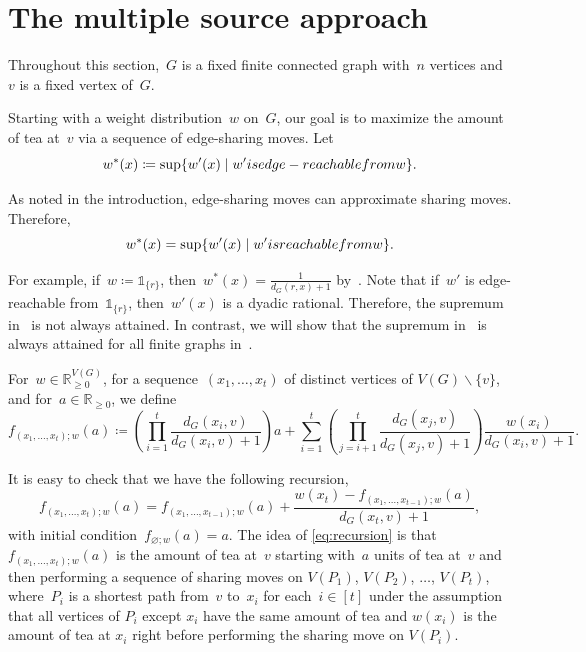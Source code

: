 \documentclass[reqno, 12pt]{amsart}
\numberwithin{equation}{section}
\numberwithin{figure}{section}
\theoremstyle{plain}
\theoremstyle{definition}
\let\emptyset=\varnothing
\let\setminus=\smallsetminus
\newcommand*{\weights}{\ensuremath{\mathbb{R}_{\geq 0}^{V(G)}}}
\begin{document}
\section{The multiple source approach}
\label{sec:second}


Throughout this section,~$G$ is a fixed finite connected graph with~$n$ vertices and~$v$ is a fixed vertex of~$G$. 

Starting with a weight distribution~$w$ on~$G$, our goal is to maximize the amount of tea at~$v$ via a sequence of edge-sharing moves. 
Let
\begin{equation} \label{eq:wstarreach}
    w^*(x) \coloneqq \sup \{ w'(x) \mid w' \textnormal{ is edge-reachable from } w \}. 
\end{equation}

As noted in the introduction, edge-sharing moves can approximate sharing moves.  Therefore,
\begin{equation} \label{eq:wstar}
    w^*(x) = \sup \{ w'(x) \mid w' \textnormal{ is reachable from } w \}. 
\end{equation}

For example, if~${w \coloneqq \mathds{1}_{\{r\}}}$, then~${w^*(x) = \frac{1}{d_G(r,x)+1}}$ by~. 
Note that if~$w'$ is edge-reachable from~$\mathds{1}_{\{r\}}$, then~${w'(x)}$ is a dyadic rational. 
Therefore, the supremum in~ is not always attained. 
In contrast, we will show that the supremum in~ is always attained for all finite graphs in~. 

For~${w \in \weights}$, for a sequence~$(x_1, \dots, x_t)$ of distinct vertices of ${V(G) \setminus \{v\}}$, and for~${a \in \mathbb{R}_{\geq 0}}$, we define
\[
        f_{(x_1, \ldots,x_t);w}(a) 
        \coloneqq \left(\prod_{i=1}^t\frac{d_G(x_i,v)}{d_G(x_i,v)+1} \right)a 
        + \sum_{i=1}^t \left(\prod_{j=i+1}^t \frac{d_G(x_j,v)}{d_G(x_j,v)+1} \right)\frac{w(x_i)}{d_G(x_i,v)+1}.
\]

It is easy to check that we have the following recursion, 
\begin{equation} \label{eq:recursion}
    f_{(x_1, \dots, x_t); w}(a) = f_{(x_1, \dots, x_{t-1}); w}(a) + \frac{w(x_t)-f_{(x_1, \dots, x_{t-1}); w}(a)}{d_G(x_t, v)+1},
\end{equation}
with initial condition~${f_{\emptyset;w}(a) = a}$. 
The idea of \eqref{eq:recursion} is that 
$f_{(x_1, \dots, x_t); w}(a)$ is the amount of tea at~$v$
starting with~$a$ units of tea at~$v$ and then performing a sequence of sharing moves on $V(P_1)$, $V(P_2)$, $\ldots$, $V(P_t)$, 
where~$P_i$ is a shortest path from~$v$ to~$x_i$ for each~${i \in [t]}$
under the assumption that all vertices of $P_i$ except $x_i$ have the same amount of tea and $w(x_i)$ is the amount of tea at $x_i$ 
right before performing the sharing move on $V(P_i)$.
\end{document}
